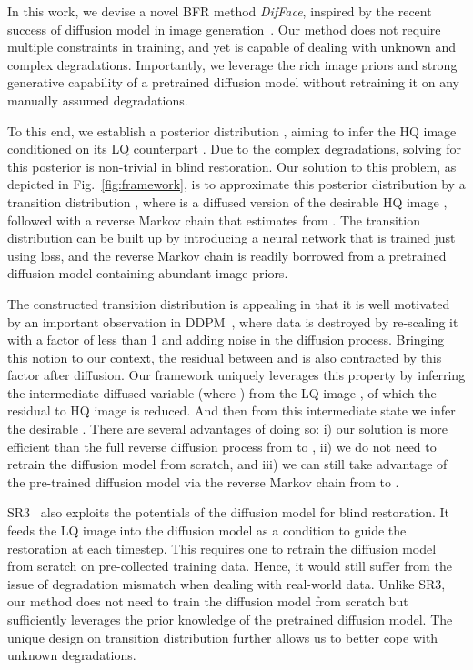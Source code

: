 \documentclass[10pt,twocolumn,letterpaper]{article}
\begin{document}
In this work, we devise a novel BFR method \textit{DifFace}, inspired by the recent success of diffusion model in image generation~\cite{sohl2015deep,dhariwal2021diffusion}.
Our method does not require multiple constraints in training, and yet is capable of dealing with unknown and complex degradations. 
Importantly, we leverage the rich image priors and strong generative capability of a pretrained diffusion model without retraining it on any manually assumed degradations. 

To this end, we establish a posterior distribution , aiming to infer the HQ image  conditioned on its LQ counterpart . Due to the complex degradations, solving for this posterior is non-trivial in blind restoration.
Our solution to this problem, as depicted in Fig.~\ref{fig:framework}, is to approximate this posterior distribution by a transition distribution , where  is a diffused version of the desirable HQ image , followed with a reverse Markov chain that estimates  from . The transition distribution  can be built up by introducing a neural network that is trained just using  loss, and the reverse Markov chain is readily borrowed from a pretrained diffusion model containing abundant image priors.

The constructed transition distribution is appealing in that it is well motivated by an important observation in DDPM~\cite{ho2020denoising}, where data is destroyed by re-scaling it with a factor of less than 1 and adding noise in the diffusion process. Bringing this notion to our context, the residual between  and  is also contracted by this factor after diffusion.
Our framework uniquely leverages this property by inferring the intermediate diffused variable  (where ) from the LQ image , of which the residual to HQ image  is reduced. And then from this intermediate state we infer the desirable . There are several advantages of doing so: i) our solution is more efficient than the full reverse diffusion process from  to , ii) we do not need to retrain the diffusion model from scratch, and iii) we can still take advantage of the pre-trained diffusion model via the reverse Markov chain from  to .

SR3~\cite{saharia2022image} also exploits the potentials of the diffusion model for blind restoration. It feeds the LQ image into the diffusion model as a condition to guide the restoration at each timestep. This requires one to retrain the diffusion model from scratch on pre-collected training data. Hence, it would still suffer from the issue of degradation mismatch when dealing with real-world data. Unlike SR3, our method does not need to train the diffusion model from scratch but sufficiently leverages the prior knowledge of the pretrained diffusion model. The unique design on transition distribution  further allows us to better cope with unknown degradations.
\end{document}
